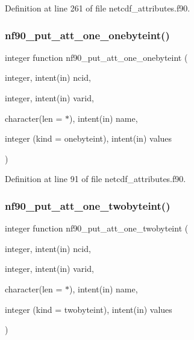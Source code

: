 Definition at line 261 of file netcdf\+\_\+attributes.\+f90.

\mbox{\label{netcdf__attributes_8f90_a1a6df85081965c935e1bee17aa5fdcaf}} 
\subsubsection{\texorpdfstring{nf90\+\_\+put\+\_\+att\+\_\+one\+\_\+onebyteint()}{nf90\_put\_att\_one\_onebyteint()}}
{\footnotesize\ttfamily integer function nf90\+\_\+put\+\_\+att\+\_\+one\+\_\+onebyteint (\begin{DoxyParamCaption}\item[{integer, intent(in)}]{ncid,  }\item[{integer, intent(in)}]{varid,  }\item[{character(len = $\ast$), intent(in)}]{name,  }\item[{integer (kind = onebyteint), intent(in)}]{values }\end{DoxyParamCaption})}



Definition at line 91 of file netcdf\+\_\+attributes.\+f90.

\mbox{\label{netcdf__attributes_8f90_af4bdea237855ce319a9f0dca1359d2dd}} 
\subsubsection{\texorpdfstring{nf90\+\_\+put\+\_\+att\+\_\+one\+\_\+twobyteint()}{nf90\_put\_att\_one\_twobyteint()}}
{\footnotesize\ttfamily integer function nf90\+\_\+put\+\_\+att\+\_\+one\+\_\+twobyteint (\begin{DoxyParamCaption}\item[{integer, intent(in)}]{ncid,  }\item[{integer, intent(in)}]{varid,  }\item[{character(len = $\ast$), intent(in)}]{name,  }\item[{integer (kind = twobyteint), intent(in)}]{values }\end{DoxyParamCaption})}



